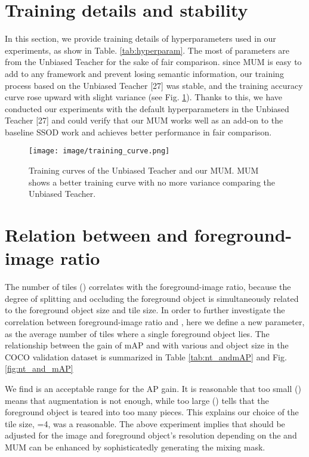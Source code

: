 \documentclass[10pt,twocolumn,letterpaper]{article}
\begin{document}
\newpage
{\small


}

\newpage
\appendix


\section{Training details and stability}
In this section, we provide training details of hyperparameters used in our experiments, as show in Table. \ref{tab:hyperparam}. 
The most of parameters are from the Unbiased Teacher for the sake of fair comparison.
since MUM is easy to add to any framework and prevent losing semantic information, our training process based on the Unbiased Teacher [27] was stable, and the training accuracy curve rose upward with slight variance  (see Fig. \ref{fig:training_curve}).
Thanks to this, we have conducted our experiments with the default hyperparameters in the Unbiased Teacher [27] and could verify that our MUM works well as an add-on to the baseline SSOD work and achieves better performance in fair comparison.


\begin{figure}[h]
    \centering
    \texttt{[image: image/training\_curve.png]}
    \caption{Training curves of the Unbiased Teacher and our MUM. 
    MUM shows a better training curve with no more variance comparing the Unbiased Teacher.}
    \label{fig:training_curve}
\end{figure}



\section{Relation between  and foreground-image ratio}
The number of tiles () correlates with the foreground-image ratio, because the degree of splitting and occluding the foreground object is simultaneously related to the foreground object size and tile size.
In order to further investigate the correlation between foreground-image ratio and , here we define a new parameter,  as the average number of tiles where a single foreground object lies.
The relationship between the gain of mAP and  with various  and object size in the COCO validation dataset is summarized in Table \ref{tab:nt_andmAP} and Fig. \ref{fig:nt_and_mAP}

We find  is an acceptable range for the AP gain. 
It is reasonable that too small  () means that augmentation is not enough, while too large  () tells that the foreground object is teared into too many pieces.
This explains our choice of the tile size, =4, was a reasonable.
The above experiment implies that  should be adjusted for the image and foreground object's resolution depending on the  and MUM can be enhanced by sophisticatedly generating the mixing mask.
\end{document}
